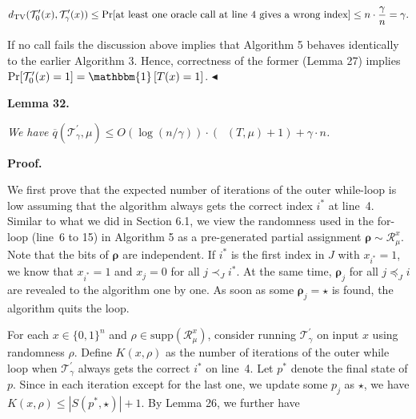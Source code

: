 \documentclass[10pt,a4paper]{article}
\begin{document}
\[\begin{gathered}
d_{\mathrm{TV}}(\mathcal{T}^{\prime}_{0}(x),\mathcal{T}^{\prime}_{\gamma}(x))\leq\Pr[\text{at least one oracle call at line\nobreak\ 4 gives a wrong index}]\leq n\cdot\frac{\gamma}{n}=\gamma.
\end{gathered}\]


If no call fails the discussion above implies that Algorithm 5 behaves identically to the earlier Algorithm 3. Hence, correctness of the former (Lemma 27) implies $\Pr[\mathcal{T}^{\prime}_{0}(x)=1]=\mathbbm{1}\left[T(x)=1\right]$.
$\blacktriangleleft$\par





\par\medskip\noindent\textbf{
\textbf{Lemma 32}\textbf{.}
}\par



\emph{We have $\overline{q}(\mathcal{T}^{\prime}_{\gamma},\mu)\leq O(\log(n/\gamma))\cdot(\mathop{\overline{sq}}(T,\mu)+1)+\gamma\cdot n$.}\par







\par\medskip\noindent\textbf{Proof.}\par




We first prove that the expected number of iterations of the outer while-loop is low assuming that the algorithm always gets the correct index $i^{*}$ at line 4. Similar to what we did in Section 6.1, we view the randomness used in the for-loop (line 6 to 15) in Algorithm 5 as a pre-generated partial assignment $\bm{\rho}\sim\mathcal{R}_{\mu}^{x}$. Note that the bits of $\bm{\rho}$ are independent. If $i^{*}$ is the first index in $J$ with $x_{i^{*}}=1$, we know that $x_{i^{*}}=1$ and $x_{j}=0$ for all $j\prec_{J}i^{*}$. At the same time, $\bm{\rho}_{j}$ for all $j\preceq_{J}i$ are revealed to the algorithm one by one. As soon as some $\bm{\rho}_{j}=\star$ is found, the algorithm quits the loop.\par




For each $x\in\{0,1\}^{n}$ and $\rho\in\mathrm{supp}(\mathcal{R}_{\mu}^{x})$, consider running $\mathcal{T}^{\prime}_{\gamma}$ on input $x$ using randomness $\rho$.
Define $K(x,\rho)$ as the number of iterations of the outer while loop when $\mathcal{T}^{\prime}_{\gamma}$ always gets the correct $i^{*}$ on line 4. Let $p^{*}$ denote the final state of $p$. Since in each iteration except for the last one, we update some $p_{j}$ as $\star$, we have $K(x,\rho)\leq|S(p^{*},\star)|+1$. By Lemma 26, we further have\par
\end{document}
